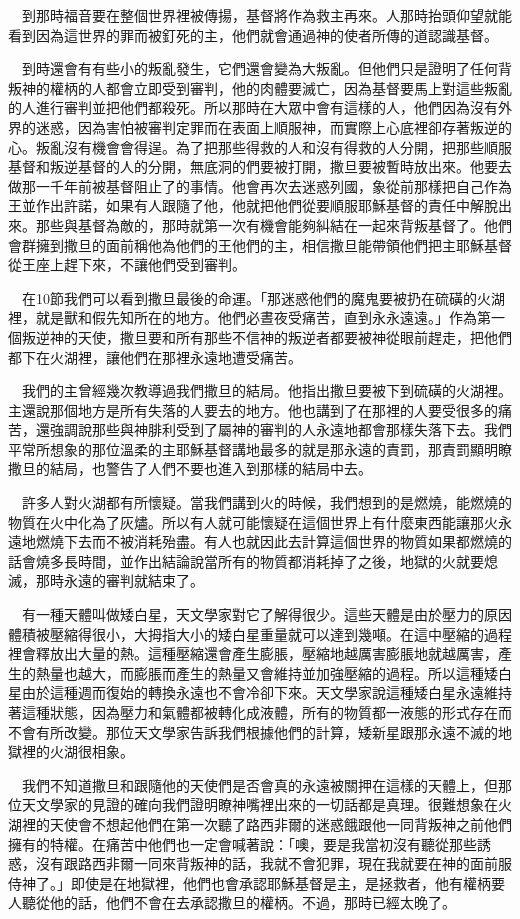 \documentclass{book}
\begin{document}
　到那時福音要在整個世界裡被傳揚，基督將作為救主再來。人那時抬頭仰望就能看到因為這世界的罪而被釘死的主，他們就會通過神的使者所傳的道認識基督。

　到時還會有有些小的叛亂發生，它們還會變為大叛亂。但他們只是證明了任何背叛神的權柄的人都會立即受到審判，他的肉體要滅亡，因為基督要馬上對這些叛亂的人進行審判並把他們都殺死。所以那時在大眾中會有這樣的人，他們因為沒有外界的迷惑，因為害怕被審判定罪而在表面上順服神，而實際上心底裡卻存著叛逆的心。叛亂沒有機會會得逞。為了把那些得救的人和沒有得救的人分開，把那些順服基督和叛逆基督的人的分開，無底洞的們要被打開，撒旦要被暫時放出來。他要去做那一千年前被基督阻止了的事情。他會再次去迷惑列國，象從前那樣把自己作為王並作出許諾，如果有人跟隨了他，他就把他們從要順服耶穌基督的責任中解脫出來。那些與基督為敵的，那時就第一次有機會能夠糾結在一起來背叛基督了。他們會群擁到撒旦的面前稱他為他們的王他們的主，相信撒旦能帶領他們把主耶穌基督從王座上趕下來，不讓他們受到審判。

　在10節我們可以看到撒旦最後的命運。「那迷惑他們的魔鬼要被扔在硫磺的火湖裡，就是獸和假先知所在的地方。他們必晝夜受痛苦，直到永永遠遠。」作為第一個叛逆神的天使，撒旦要和所有那些不信神的叛逆者都要被神從眼前趕走，把他們都下在火湖裡，讓他們在那裡永遠地遭受痛苦。

　我們的主曾經幾次教導過我們撒旦的結局。他指出撒旦要被下到硫磺的火湖裡。主還說那個地方是所有失落的人要去的地方。他也講到了在那裡的人要受很多的痛苦，還強調說那些與神腓利受到了屬神的審判的人永遠地都會那樣失落下去。我們平常所想象的那位溫柔的主耶穌基督講地最多的就是那永遠的責罰，那責罰顯明瞭撒旦的結局，也警告了人們不要也進入到那樣的結局中去。

　許多人對火湖都有所懷疑。當我們講到火的時候，我們想到的是燃燒，能燃燒的物質在火中化為了灰燼。所以有人就可能懷疑在這個世界上有什麼東西能讓那火永遠地燃燒下去而不被消耗殆盡。有人也就因此去計算這個世界的物質如果都燃燒的話會燒多長時間，並作出結論說當所有的物質都消耗掉了之後，地獄的火就要熄滅，那時永遠的審判就結束了。

　有一種天體叫做矮白星，天文學家對它了解得很少。這些天體是由於壓力的原因體積被壓縮得很小，大拇指大小的矮白星重量就可以達到幾噸。在這中壓縮的過程裡會釋放出大量的熱。這種壓縮還會產生膨脹，壓縮地越厲害膨脹地就越厲害，產生的熱量也越大，而膨脹而產生的熱量又會維持並加強壓縮的過程。所以這種矮白星由於這種週而復始的轉換永遠也不會冷卻下來。天文學家說這種矮白星永遠維持著這種狀態，因為壓力和氣體都被轉化成液體，所有的物質都一液態的形式存在而不會有所改變。那位天文學家告訴我們根據他們的計算，矮新星跟那永遠不滅的地獄裡的火湖很相象。

　我們不知道撒旦和跟隨他的天使們是否會真的永遠被關押在這樣的天體上，但那位天文學家的見證的確向我們證明瞭神嘴裡出來的一切話都是真理。很難想象在火湖裡的天使會不想起他們在第一次聽了路西非爾的迷惑餓跟他一同背叛神之前他們擁有的特權。在痛苦中他們也一定會喊著說：「噢，要是我當初沒有聽從那些誘惑，沒有跟路西非爾一同來背叛神的話，我就不會犯罪，現在我就要在神的面前服侍神了。」即使是在地獄裡，他們也會承認耶穌基督是主，是拯救者，他有權柄要人聽從他的話，他們不會在去承認撒旦的權柄。不過，那時已經太晚了。
\end{document}
